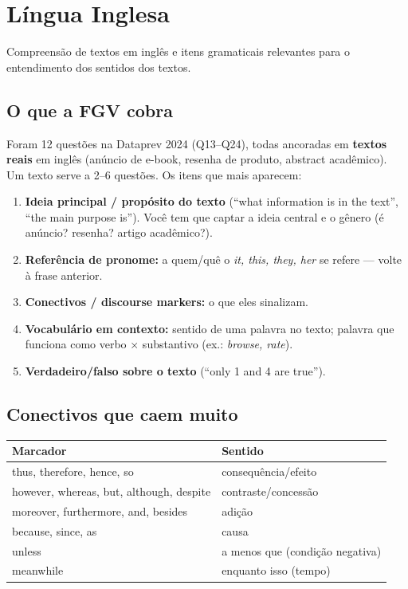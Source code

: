 \chapter{Língua Inglesa}
\label{cap:ingles}

\begin{edital}
Compreensão de textos em inglês e itens gramaticais relevantes para o
entendimento dos sentidos dos textos.
\end{edital}

\section{O que a FGV cobra}

Foram 12 questões na Dataprev 2024 (Q13--Q24), todas ancoradas em
\textbf{textos reais} em inglês (anúncio de e-book, resenha de produto,
abstract acadêmico). Um texto serve a 2--6 questões. Os itens que mais
aparecem:

\begin{enumerate}
\item \textbf{Ideia principal / propósito do texto} (``what information is
in the text'', ``the main purpose is''). Você tem que captar a ideia central
e o gênero (é anúncio? resenha? artigo acadêmico?).
\item \textbf{Referência de pronome:} a quem/quê o \textit{it, this, they,
her} se refere --- volte à frase anterior.
\item \textbf{Conectivos / discourse markers:} o que eles sinalizam.
\item \textbf{Vocabulário em contexto:} sentido de uma palavra no texto;
palavra que funciona como verbo $\times$ substantivo (ex.: \textit{browse,
rate}).
\item \textbf{Verdadeiro/falso sobre o texto} (``only 1 and 4 are true'').
\end{enumerate}

\section{Conectivos que caem muito}

\begin{center}
\begin{tabular}{@{}p{5.4cm}p{5.4cm}@{}}
\toprule
\textbf{Marcador} & \textbf{Sentido} \\
\midrule
thus, therefore, hence, so & consequência/efeito \\
however, whereas, but, although, despite & contraste/concessão \\
moreover, furthermore, and, besides & adição \\
because, since, as & causa \\
unless & a menos que (condição negativa) \\
meanwhile & enquanto isso (tempo) \\
\bottomrule
\end{tabular}
\end{center}

